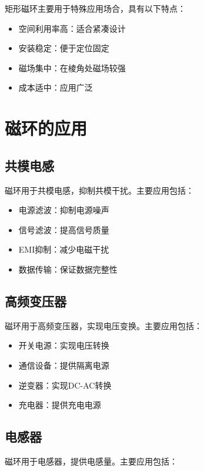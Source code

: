 \documentclass[12pt,UTF8]{ctexbook}
\begin{document}
矩形磁环主要用于特殊应用场合，具有以下特点：

\begin{itemize}[leftmargin=2cm]
    \item 空间利用率高：适合紧凑设计
    \item 安装稳定：便于定位固定
    \item 磁场集中：在棱角处磁场较强
    \item 成本适中：应用广泛
\end{itemize}

\section{磁环的应用}

\subsection{共模电感}

磁环用于共模电感，抑制共模干扰。主要应用包括：

\begin{itemize}[leftmargin=2cm]
    \item 电源滤波：抑制电源噪声
    \item 信号滤波：提高信号质量
    \item EMI抑制：减少电磁干扰
    \item 数据传输：保证数据完整性
\end{itemize}

\subsection{高频变压器}

磁环用于高频变压器，实现电压变换。主要应用包括：

\begin{itemize}[leftmargin=2cm]
    \item 开关电源：实现电压转换
    \item 通信设备：提供隔离电源
    \item 逆变器：实现DC-AC转换
    \item 充电器：提供充电电源
\end{itemize}

\subsection{电感器}

磁环用于电感器，提供电感量。主要应用包括：
\end{document}
